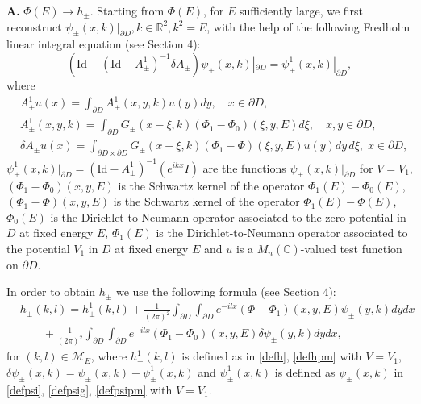 \documentclass[11pt,a4paper,english,subeqn]{amsart}
\theoremstyle{plain}
\theoremstyle{definition}
\numberwithin{equation}{section}
\begin{document}
{\bf A.} $\Phi(E) \longrightarrow h_{\pm}$. Starting from $\Phi(E)$, for $E$ sufficiently large, we first reconstruct $\psi_{\pm}(x,k)|_{\partial D}, k \in {\mathbb{R}}^2, k^2 =E$, with the help of the following Fredholm linear integral equation (see Section 4):
\begin{equation} \label{eqa112}
(\mathrm{Id} + (\mathrm{Id}-A^1_{\pm})^{-1}\delta A_{\pm})\psi_{\pm}(x,k)|_{\partial D} = \psi^1_{\pm}(x,k)|_{\partial D},
\end{equation}
where 
\begin{align}
&A^1_{\pm}u(x) = \int_{\partial D} A^1_{\pm}(x,y,k)u(y)dy, \quad x \in \partial D,\\
&A^1_{\pm}(x,y,k)=\int_{\partial D} G_{\pm}(x-\xi,k) \left(\Phi_1 - \Phi_0 \right)(\xi,y,E) d\xi, \quad x,y \in \partial D,\\
&\delta A_{\pm}u(x) = \int_{\partial D \times \partial D}\! \! \! \! \! \! \! \! \! \! \! \! G_{\pm}(x-\xi,k)(\Phi_1 - \Phi)(\xi,y,E)u(y)dy \, d\xi, \; x \in \partial D,
\end{align}
$\psi^1_{\pm}(x,k)|_{\partial D}= (\mathrm{Id}-A^1_{\pm})^{-1} (e^{ikx}I)$ are the functions $\psi_{\pm}(x,k)|_{\partial D}$ for $V=V_1$, $(\Phi_1-\Phi_0)(x,y,E)$ is the Schwartz kernel of the operator $\Phi_1(E)-\Phi_0(E)$, $(\Phi_1-\Phi)(x,y,E)$ is the Schwartz kernel of the operator $\Phi_1(E)-\Phi(E)$, $\Phi_0(E)$ is the Dirichlet-to-Neumann operator associated to the zero potential in $D$ at fixed energy $E$, $\Phi_1(E)$ is the Dirichlet-to-Neumann operator associated to the potential $V_1$ in $D$ at fixed energy $E$ and $u$ is a ${M_{n}({\mathbb{C}})}$-valued test function on $\partial D$.

In order to obtain $h_{\pm}$ we use the following formula (see Section 4):
\begin{align} \label{recah2}
&h_{\pm}(k,l) = h^1_{\pm}(k,l) + \frac{1}{(2 \pi)^2} \int_{\partial D} \int_{\partial D}e^{-ilx}(\Phi-\Phi_1)(x,y,E)\psi_{\pm}(y,k)dy dx \\ \nonumber
&\qquad + \frac{1}{(2 \pi)^2} \int_{\partial D} \int_{\partial D}e^{-ilx}(\Phi_1-\Phi_0)(x,y,E)\delta \psi_{\pm}(y,k)dy dx,
\end{align}
for $(k,l) \in {\mathscr{M}_E}$, where $h^1_{\pm}(k,l)$ is defined as in \eqref{defh}, \eqref{defhpm} with $V=V_1$, $\delta \psi_{\pm}(x,k)=\psi_{\pm}(x,k)-\psi^1_{\pm}(x,k)$ and $\psi^1_{\pm}(x,k)$ is defined as $\psi_{\pm}(x,k)$ in \eqref{defpsi}, \eqref{defpsig}, \eqref{defpsipm} with $V= V_1$.
\end{document}
